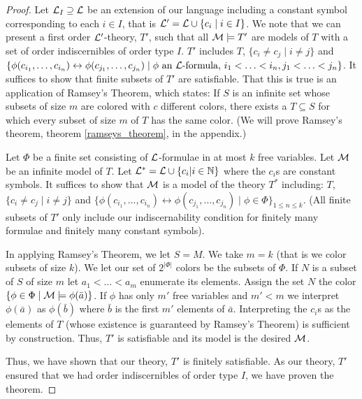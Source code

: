 \begin{proof}
Let \(\mathcal{L}_I \supseteq \mathcal{L}\) be an extension of our language including a constant symbol corresponding to each \(i \in I\), that is \(\mathcal{L}' = \mathcal{L} \cup \{c_i \mid i \in I\}\).
We note that we can present a first order \(\mathcal{L}'\)-theory, \(T'\), such that all \(\mathcal{M} \models T'\) are models of \(T\) with a set of order indiscernibles of order type \(I\).
\(T'\) includes \(T\), \(\{c_i \neq c_j \mid i \neq j\}\) and \(\{\phi(c_{i_1}, \ldots, c_{i_n}) \leftrightarrow \phi(c_{j_1}, \ldots, c_{j_n}) \mid \phi \text{ an } \mathcal{L} \text{-formula, } i_1 < \ldots < i_n, j_1 < \ldots < j_n\}\). 
It suffices to show that finite subsets of \(T'\) are satisfiable. 
That this is true is an application of Ramsey's Theorem, which states: 
If \(S\) is an infinite set whose subsets of size \(m\) are colored with \(c\) different colors, there exists a \(T \subseteq S\) for which every subset of size \(m\) of \(T\) has the same color. 
(We will prove Ramsey's theorem, theorem \ref{ramseys_theorem}, in the appendix.)

Let \(\Phi\) be a finite set consisting of \(\mathcal{L}\)-formulae in at most \(k\) free variables. 
Let \(\mathcal{M}\) be an infinite model of \(T\). 
Let \(\mathcal{L}^* = \mathcal{L} \cup \{c_i | i \in \mathbb{N}\}\) where the \(c_i\)s are constant symbols.
It suffices to show that \(\mathcal{M}\) is a model of the theory \(T^*\) including: \(T\), \(\{c_i \neq c_j \mid i \neq j\}\) and \(\{\phi(c_{i_1}, \ldots, c_{i_n}) \leftrightarrow \phi(c_{j_1}, \ldots, c_{j_n}) \mid \phi \in \Phi\}_{1 \leq n \leq k}\). 
(All finite subsets of \(T'\) only include our indiscernability condition for finitely many formulae and finitely many constant symbols).

In applying Ramsey's Theorem, we let \(S = M\). 
We take \(m = k\) (that is we color subsets of size \(k\)).
We let our set of \(2^{|\Phi|}\) colors be the subsets of \(\Phi\). 
If \(N\) is a subset of \(S\) of size \(m\) let \(a_1 < \ldots < a_m\) enumerate its elements. 
Assign the set \(N\) the color \(\{\phi \in \Phi \mid \mathcal{M} \models \phi(\bar{a})\}\). 
If \(\phi\) has only \(m'\) free variables and \(m' < m\) we interpret \(\phi(\bar{a})\) as \(\phi(\bar{b})\) where \(\bar{b}\) is the first \(m'\) elements of \(\bar{a}\).
Interpreting the \(c_i\)s as the elements of \(T\) (whose existence is guaranteed by Ramsey's Theorem) is sufficient by construction. Thus, \(T'\) is satisfiable and its model is the desired \(\mathcal{M}\).

Thus, we have shown that our theory, \(T'\) is finitely satisfiable.
As our theory, \(T'\) ensured that we had order indiscernibles of order type \(I\), we have proven the theorem.
\end{proof}

